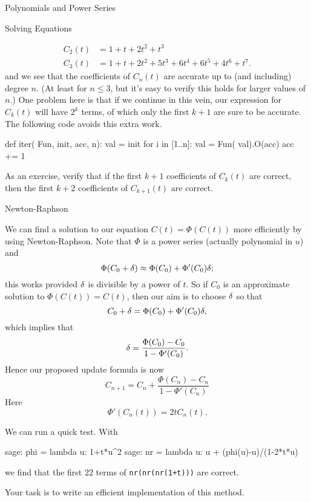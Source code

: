 \begin{chap}{Polynomials and Power Series}
\begin{sect}{Solving Equations}
\begin{para}
\begin{align*}
    C_2(t) &= 1 + t + 2t^2 + t^3\\
    C_3(t) &= 1 + t + 2t^{2} + 5t^{3} + 6t^{4} + 6t^{5} + 4t^{6} + t^{7}.
\end{align*}
and we see that the coefficients of $C_n(t)$ are accurate up to 
(and including) degree $n$. (At least for $n\le3$, but it's easy to 
verify this holds for larger values of $n$.) One problem
here is that if we continue in this vein, our expression for $C_k(t)$
will have $2^k$ terms, of which only the first $k+1$ are sure to be accurate.
The following code avoids this extra work.
\end{para}
%
\begin{sageblock}
def iter( Fun, init, acc, n):
    val = init
    for i in [1..n]:
        val = Fun( val).O(acc)
        acc += 1
\end{sageblock}
%
\begin{para}
As an exercise, verify that if the first $k+1$ coefficients of $C_k(t)$
are correct, then the first $k+2$ coefficients of $C_{k+1}(t)$ are correct.
\end{para}
%
\end{sect}
%
\begin{sect}{Newton-Raphson}
%
\begin{para}
We can find a solution to our equation $C(t) =\Phi(C(t))$ more efficiently by
using Newton-Raphson. Note that $\Phi$ is a power series (actually polynomial in $u$)
and
\[
    \Phi(C_0+\delta) \approx \Phi(C_0) +\Phi'(C_0)\delta;
\]
this works provided $\delta$ is divisible by a power of $t$.
So if $C_0$ is an approximate solution to $\Phi(C(t))=C(t)$, then our aim is to 
choose $\delta$ so that
\[
    C_0 + \delta = \Phi(C_0) +\Phi'(C_0)\delta,
\]
which implies that
\[
    \delta = \frac{\Phi(C_0)-C_0}{1-\Phi'(C_0)}.
\]
Hence our proposed update formula is now
\[
    C_{n+1} = C_n + \frac{\Phi(C_n)-C_n}{1-\Phi'(C_n)}
\]
Here
\[
    \Phi'(C_n(t)) = 2tC_n(t).
\]
\end{para}
%
\begin{para}
We can run a quick test. With
\end{para}
%
\begin{sageexample}
sage: phi = lambda u: 1+t*u^2
sage: nr = lambda u: u + (phi(u)-u)/(1-2*t*u)
\end{sageexample}
%
\begin{para}
we find that the first 22 terms of \verb|nr(nr(nr(1+t)))| are correct.
\end{para}
%
\begin{para}
Your task is to write an efficient implementation of this method.

\end{para}
\end{sect}
\end{chap}
